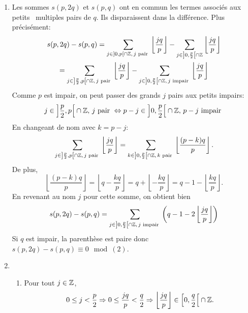 \begin{enumerate}
\begin{enumerate}
  \item Il suffit de remarquer que $p$ étant impair: 
  $\left\lceil \frac{p}{2} \right\rceil = \frac{p+1}{2} \Rightarrow \left\lceil \frac{p}{2} \right\rceil -1 = \frac{p-1}{2}$ 
et d'utiliser b. pour obtenir $\llbracket 0, \frac{p-1}{2} \rrbracket = \left[ 0, \frac{p}{2}\right[ \cap \Z$.
  \end{enumerate}
  
  \item Les sommes $s(p,2q)$ et $s(p,q)$ ont en commun les termes associés aux \og petits\fg~ multiples pairs de $q$. Ils disparaissent dans la différence. Plus précisément:
\begin{multline*}
  s(p,2q) - s(p,q) = \sum_{j \in \left]0, p\right[ \cap \mathbb{Z},\, j\text{ pair }}\left\lfloor \frac{jq}{p}\right\rfloor
  - \sum_{j \in \left]0, \frac{p}{2}\right[ \cap \mathbb{Z}}\left\lfloor \frac{jq}{p}\right\rfloor \\
  = \sum_{j \in \left]\frac{p}{2}, p\right[ \cap \mathbb{Z},\, j\text{ pair }}\left\lfloor \frac{jq}{p}\right\rfloor
  - \sum_{j \in \left]0, \frac{p}{2}\right[ \cap \mathbb{Z} ,\, j\text{ impair }}\left\lfloor \frac{jq}{p}\right\rfloor
\end{multline*}
Comme $p$ est impair, on peut passer des grands $j$ pairs aux petits impairs:
\[
  j \in \left]\frac{p}{2}, p\right[ \cap \mathbb{Z},\, j\text{ pair } \Leftrightarrow  p - j \in \left]0, \frac{p}{2} \right[ \cap \mathbb{Z},\, p-j\text{ impair }
\]
En changeant de nom avec $k = p - j$:
\[
  \sum_{j \in \left]\frac{p}{2}, p\right[ \cap \mathbb{Z},\, j\text{ pair }}\left\lfloor \frac{jq}{p}\right\rfloor
  = \sum_{k \in \left]0 , \frac{p}{2}\right[ \cap \mathbb{Z},\, k\text{ pair }}\left\lfloor \frac{(p-k)q}{p}\right\rfloor.
\]
De plus,
\[
  \left\lfloor \frac{(p-k)q}{p}\right\rfloor = \left\lfloor q -\frac{kq}{p}\right\rfloor
  = q + \left\lfloor -\frac{kq}{p}\right\rfloor 
  = q - 1 -\left\lfloor \frac{kq}{p}\right\rfloor.
\]
En revenant au nom $j$ pour cette somme, on obtient bien
\[
  s(p,2q) - s(p,q) =\sum_{j \in \left]0, \frac{p}{2}\right[ \cap \mathbb{Z} ,\, j\text{ impair }}\left( q-1 -2\left\lfloor \frac{jq}{p}\right\rfloor\right)
\]
Si $q$ est impair, la parenthèse est paire donc $s(p,2q) - s(p,q) \equiv 0\mod (2)$.
  
  \item 
  \begin{enumerate}
    \item Pour tout $j \in \mathbb{Z}$,
\[
  0 \leq j < \frac{p}{2} \Rightarrow 0 \leq \frac{jq}{p} < \frac{q}{2} \Rightarrow \left\lfloor \frac{jq}{p} \right\rfloor \in \left[0, \frac{q}{2} \right[ \cap \mathbb{Z}. 
\]


\end{enumerate}
\end{enumerate}
